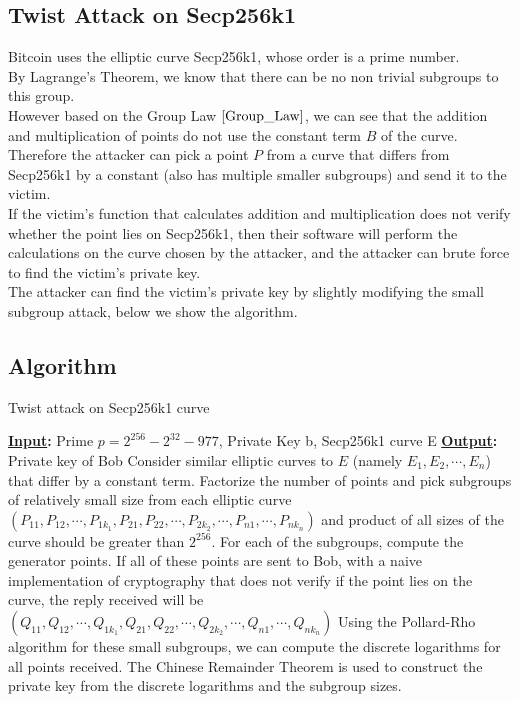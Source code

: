 \subsection{Twist Attack on Secp256k1}
Bitcoin uses the elliptic curve Secp256k1, whose order is a prime number. \\ 
By Lagrange's Theorem, we know that there can be no non trivial subgroups to this group.\\
However based on the Group Law $\ref{Group_Law}$, we can see that the addition and multiplication of points do not use the constant term $B$ of the curve. Therefore the attacker can pick a point $P$ from a curve that differs from Secp256k1 by a constant (also has multiple smaller subgroups) and send it to the victim. \\ 
If the victim's function that calculates addition and multiplication does not verify whether the point lies on Secp256k1, then their software will perform the calculations on the curve chosen by the attacker, and the attacker can brute force to find the victim's private key.\\
The attacker can find the victim's private key by slightly modifying the small subgroup attack, below we show the algorithm.

\subsection{Algorithm}
\begin{algorithm}
    \caption{Twist attack on Secp256k1 curve}
    \begin{algorithmic}[1]
    \State \textbf{\underline{Input}:} Prime $p = 2^{256} - 2^{32} - 977$, Private Key b, Secp256k1 curve E 
    \State \textbf{\underline{Output}:} Private key of Bob 
    \State Consider similar elliptic curves to $E$ (namely $E_1, E_2, \cdots, E_n$) that differ by a constant term. 
    \State Factorize the number of points and pick subgroups of relatively small size from each elliptic curve $\left(P_{11}, P_{12}, \cdots, P_{1 k_1}, P_{21}, P_{22}, \cdots, P_{2 k_2}, \cdots, P_{n 1}, \cdots, P_{n k_n} \right)$ and product of all sizes of the curve should be greater than $2^{256}$. 
    \State For each of the subgroups, compute the generator points. 
    \State If all of these points are sent to Bob, with a naive implementation of cryptography that does not verify if the point lies on the curve, the reply received will be $\left(Q_{11}, Q_{12}, \cdots, Q_{1 k_1}, Q_{21}, Q_{22}, \cdots, Q_{2 k_2}, \cdots, Q_{n 1}, \cdots, Q_{n k_n} \right)$
    \State Using the Pollard-Rho algorithm for these small subgroups, we can compute the discrete logarithms for all points received. 
    \State The Chinese Remainder Theorem is used to construct the private key from the discrete logarithms and the subgroup sizes. 
    \EndProcedure
    \end{algorithmic}
\end{algorithm}

